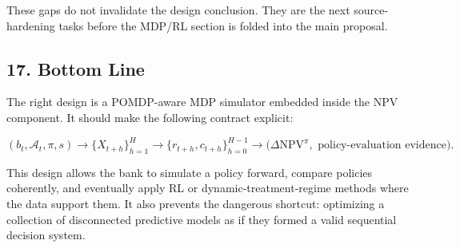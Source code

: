 \documentclass[
]{article}
\newcommand{\NPV}{\mathrm{NPV}}
\begin{document}
These gaps do not invalidate the design conclusion. They are the next
source-hardening tasks before the MDP/RL section is folded into the main
proposal.

\hypertarget{bottom-line}{%
\subsection{17. Bottom Line}\label{bottom-line}}

The right design is a POMDP-aware MDP simulator embedded inside the NPV
component. It should make the following contract explicit:

\begin{equation}
  (b_t,\mathcal{A}_t,\pi,s)
  \longrightarrow
  \{X_{t+h}\}_{h=1}^{H}
  \longrightarrow
  \{r_{t+h},c_{t+h}\}_{h=0}^{H-1}
  \longrightarrow
  \bigl(\Delta\NPV^{\pi},\text{ policy-evaluation evidence}\bigr).
  \label{eq:bottom-line-contract}
\end{equation}

This design allows the bank to simulate a policy forward, compare
policies coherently, and eventually apply RL or dynamic-treatment-regime
methods where the data support them. It also prevents the dangerous
shortcut: optimizing a collection of disconnected predictive models as
if they formed a valid sequential decision system.
\end{document}

